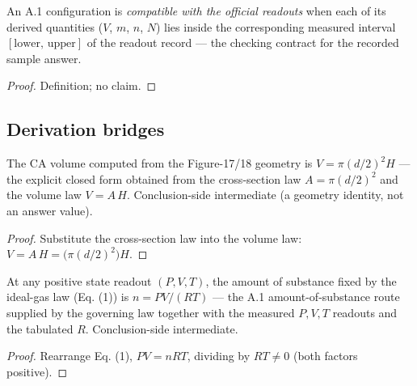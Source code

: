 \begin{definition}
\label{def:IPhO2026Problems_problem_IPhO_2026_4_A_1:CompatibleWithReadouts}
An A.1 configuration is \emph{compatible with the official readouts}
when each of its derived quantities ($V$, $m$, $n$, $N$) lies inside
the corresponding measured interval $[\mathrm{lower},\,\mathrm{upper}]$
of the readout record --- the checking contract for the recorded
sample answer.
\end{definition}
\begin{proof}
Definition; no claim.
\end{proof}

\subsection*{Derivation bridges}

\begin{theorem}
\label{thm:IPhO2026Problems_problem_IPhO_2026_4_A_1:volume_closed_form}
The CA volume computed from the Figure-17/18 geometry is
$V = \pi (d/2)^2 H$ --- the explicit closed form obtained from the
cross-section law $A = \pi (d/2)^2$ and the volume law $V = A\,H$.
Conclusion-side intermediate (a geometry identity, not an answer
value).
\end{theorem}
\begin{proof}
Substitute the cross-section law into the volume law:
$V = A\,H = \bigl(\pi (d/2)^2\bigr) H$.
\end{proof}

\begin{theorem}
\label{thm:IPhO2026Problems_problem_IPhO_2026_4_A_1:amountFromIdealGas}
At any positive state readout $(P, V, T)$, the amount of substance
fixed by the ideal-gas law (Eq. (1)) is
$n = P V / (R T)$ --- the A.1 amount-of-substance route supplied by
the governing law together with the measured $P, V, T$ readouts and
the tabulated $R$.  Conclusion-side intermediate.
\end{theorem}
\begin{proof}
Rearrange Eq. (1), $P V = n R T$, dividing by $R T \neq 0$ (both
factors positive).
\end{proof}

